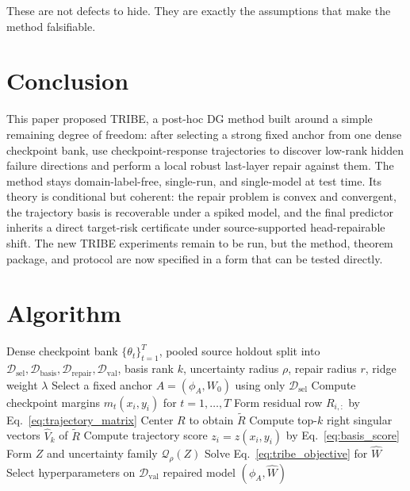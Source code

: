 \documentclass{article}
\newcommand{\cD}{\mathcal{D}}
\newcommand{\cQ}{\mathcal{Q}}
\newcommand{\tribe}{\textup{\textsc{TRIBE}}}
\newcommand{\1}{\mathbbm{1}}
\begin{document}
These are not defects to hide. They are exactly the assumptions that make the method falsifiable.

\section{Conclusion}

This paper proposed \tribe{}, a post-hoc DG method built around a simple remaining degree of freedom: after selecting a strong fixed anchor from one dense checkpoint bank, use checkpoint-response trajectories to discover low-rank hidden failure directions and perform a local robust last-layer repair against them. The method stays domain-label-free, single-run, and single-model at test time. Its theory is conditional but coherent: the repair problem is convex and convergent, the trajectory basis is recoverable under a spiked model, and the final predictor inherits a direct target-risk certificate under source-supported head-repairable shift. The new \tribe{} experiments remain to be run, but the method, theorem package, and protocol are now specified in a form that can be tested directly.




\appendix

\section{Algorithm}

\begin{algorithm}[H]
    \caption{\tribe{}}
    \label{alg:tribe}
    \begin{algorithmic}[1]
        \Require Dense checkpoint bank \(\{\theta_t\}_{t=1}^T\), pooled source holdout split into \(\cD_{\mathrm{sel}}, \cD_{\mathrm{basis}}, \cD_{\mathrm{repair}}, \cD_{\mathrm{val}}\), basis rank \(k\), uncertainty radius \(\rho\), repair radius \(r\), ridge weight \(\lambda\)
        \State Select a fixed anchor \(A=(\phi_A,W_0)\) using only \(\cD_{\mathrm{sel}}\)
        \For{each \((x_i,y_i)\in \cD_{\mathrm{basis}}\)}
            \State Compute checkpoint margins \(m_t(x_i,y_i)\) for \(t=1,\dots,T\)
            \State Form residual row \(R_{i,:}\) by Eq.~\eqref{eq:trajectory_matrix}
        \EndFor
        \State Center \(R\) to obtain \(\widetilde R\)
        \State Compute top-\(k\) right singular vectors \(\widehat V_k\) of \(\widetilde R\)
        \For{each \((x_i,y_i)\in \cD_{\mathrm{repair}}\)}
            \State Compute trajectory score \(z_i = z(x_i,y_i)\) by Eq.~\eqref{eq:basis_score}
        \EndFor
        \State Form \(Z\) and uncertainty family \(\cQ_\rho(Z)\)
        \State Solve Eq.~\eqref{eq:tribe_objective} for \(\widehat W\)
        \State Select hyperparameters on \(\cD_{\mathrm{val}}\)
        \State \Return repaired model \((\phi_A,\widehat W)\)
    \end{algorithmic}
\end{algorithm}
\end{document}
